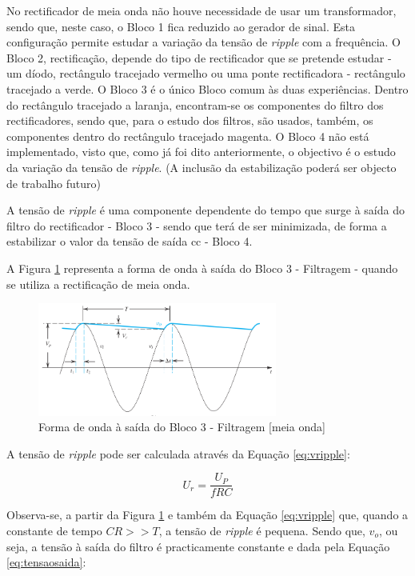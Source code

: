 No rectificador de meia onda não houve necessidade de usar um transformador, sendo que, neste caso, o Bloco 1 fica reduzido ao gerador de sinal. Esta configuração permite estudar a variação da tensão de \textit{ripple} com a frequência. O Bloco 2, rectificação, depende do tipo de rectificador que se pretende estudar - um díodo, rectângulo tracejado vermelho ou uma ponte rectificadora - rectângulo tracejado a verde. O Bloco 3 é o único Bloco comum às duas experiências. Dentro do rectângulo tracejado a laranja, encontram-se os componentes do filtro dos rectificadores, sendo que, para o estudo dos filtros, são usados, também, os componentes dentro do rectângulo tracejado magenta. O Bloco 4 não está implementado, visto que, como já foi dito anteriormente, o objectivo é o estudo da variação da tensão de \textit{ripple}. (A inclusão da estabilização poderá ser objecto de trabalho futuro)

A tensão de \textit{ripple} é uma componente dependente do tempo que surge à saída do filtro do rectificador - Bloco 3 - sendo que terá de ser minimizada, de forma a estabilizar o valor da tensão de saída \acrshort{cc} - Bloco 4. \cite{sedrasmith} 

A Figura \ref{fig:sedraripple} representa a forma de onda à saída do Bloco 3 - Filtragem - quando se utiliza a rectificação de meia onda.
\begin{figure}[hbtp]
	\centering
	\includegraphics[width=0.7\textwidth]{figures/sedra_ripple.png}
	\caption{Forma de onda à saída do Bloco 3 - Filtragem [meia onda] \cite{sedrasmith}}
	\label{fig:sedraripple}
\end{figure}

A tensão de \textit{ripple} pode ser calculada através da Equação \ref{eq:vripple}:

\begin{equation} \label{eq:vripple}
	U_{r} = \frac{U_{P}}{fRC}
\end{equation}

Observa-se, a partir da Figura \ref{fig:sedraripple} e também da Equação \ref{eq:vripple} que, quando a constante de tempo $CR >> T$, a tensão de \textit{ripple} é pequena. Sendo que, $v_{o}$, ou seja, a tensão à saída do filtro é practicamente constante e dada pela Equação \ref{eq:tensaosaida}:

